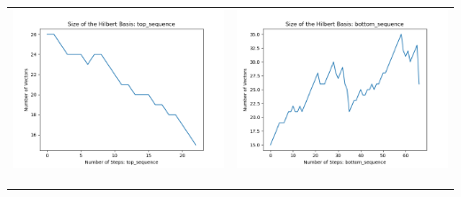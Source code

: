 \documentclass[10pt]{article}
\begin{document}
\begin{tabular}{c|c}
\begin{minipage}{.45\textwidth}
\includegraphics[width=\textwidth]{"DATA/5d/5 generators 2 bound D/top_sequence SIZE"}
\end{minipage} &
\begin{minipage}{.45\textwidth}
\includegraphics[width=\textwidth]{"DATA/5d/5 generators 2 bound D bottomup/bottom_sequence SIZE"}
\end{minipage} \\ \\
\hline \\\begin{minipage}{.45\textwidth}

\end{minipage}
\end{tabular}
\end{document}
